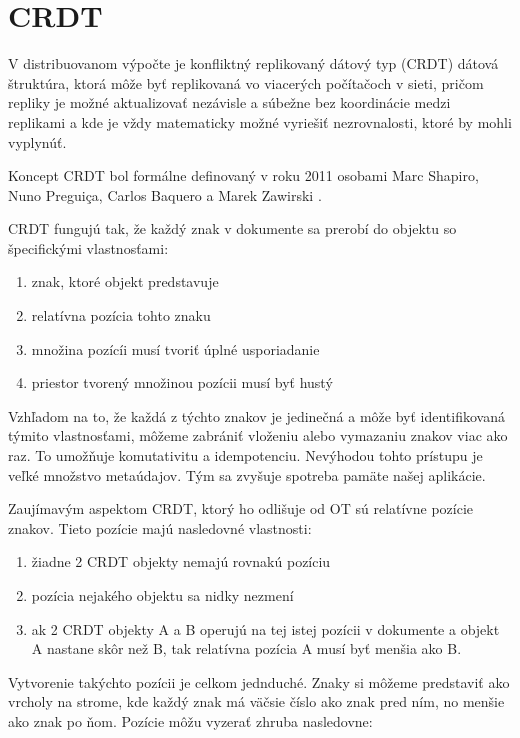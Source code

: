 \chapter{CRDT}

\label{kap:cdrt} %

V distribuovanom výpočte je konfliktný replikovaný dátový typ (CRDT) dátová štruktúra,
ktorá môže byť replikovaná vo viacerých počítačoch v sieti, pričom repliky je možné
aktualizovať nezávisle a súbežne bez koordinácie medzi replikami a kde je vždy
matematicky možné vyriešiť nezrovnalosti, ktoré by mohli vyplynúť.

Koncept CRDT bol formálne definovaný v roku 2011 osobami
Marc Shapiro, Nuno Preguiça, Carlos Baquero a Marek Zawirski \cite{crdt_definition}.

CRDT fungujú tak, že každý znak v dokumente sa prerobí do objektu so špecifickými vlastnosťami:
\begin{enumerate}
\label{def_pozicie}
  \item znak, ktoré objekt predstavuje
  \item relatívna pozícia tohto znaku
  \item množina pozícíi musí tvoriť úplné usporiadanie
  \item priestor tvorený množinou pozícii musí byť hustý
\end{enumerate}
Vzhľadom na to, že každá z týchto znakov je jedinečná a môže byť identifikovaná
týmito vlastnosťami, môžeme zabrániť vloženiu alebo vymazaniu znakov viac ako raz.
To umožňuje komutativitu a idempotenciu. Nevýhodou tohto prístupu je veľké množstvo metaúdajov.
Tým sa zvyšuje spotreba pamäte našej aplikácie.

Zaujímavým aspektom CRDT, ktorý ho odlišuje od OT sú relatívne pozície znakov. Tieto pozície majú
nasledovné vlastnosti:
\begin{enumerate}
  \item žiadne 2 CRDT objekty nemajú rovnakú pozíciu
  \item pozícia nejakého objektu sa nidky nezmení
  \item ak 2 CRDT objekty A a B operujú na tej istej pozícii v dokumente a objekt A
  nastane skôr než B, tak relatívna pozícia A musí byť menšia ako B.
\end{enumerate}
Vytvorenie takýchto pozícii je celkom jednduché.
Znaky si môžeme predstaviť ako vrcholy na strome, kde každý znak má väčsie číslo ako znak pred
ním, no menšie ako znak po ňom. Pozície môžu vyzerať zhruba nasledovne:

